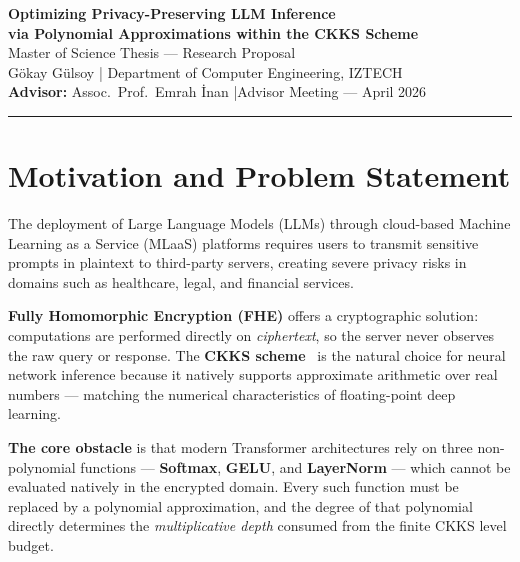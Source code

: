 \documentclass[12pt, a4paper]{article}
\begin{document}

\begin{center}
  {\LARGE\bfseries\color{iztechblue}
    Optimizing Privacy-Preserving LLM Inference\\[4pt]
    via Polynomial Approximations within the CKKS Scheme}\\[1.2em]
  {\large Master of Science Thesis — Research Proposal}\\[0.4em]
  {\normalsize
    Gökay Gülsoy \quad|\quad
    Department of Computer Engineering, IZTECH\\[0.3em]
    \textbf{Advisor:} Assoc.\ Prof.\ Emrah İnan \quad|\quad Advisor Meeting — April 2026}
\end{center}

\vspace{0.5em}
\noindent\rule{\textwidth}{1.5pt}
\vspace{0.3em}

\section{Motivation and Problem Statement}

The deployment of Large Language Models (LLMs) through cloud-based Machine Learning as a Service (MLaaS) platforms requires users to transmit sensitive prompts in plaintext to third-party servers, creating severe privacy risks in domains such as healthcare, legal, and financial services.

\textbf{Fully Homomorphic Encryption (FHE)} offers a cryptographic solution: computations are performed directly on \emph{ciphertext}, so the server never observes the raw query or response. The \textbf{CKKS scheme}~\cite{cheon2017} is the natural choice for neural network inference because it natively supports approximate arithmetic over real numbers — matching the numerical characteristics of floating-point deep learning.

\textbf{The core obstacle} is that modern Transformer architectures rely on three non-polynomial functions — \textbf{Softmax}, \textbf{GELU}, and \textbf{LayerNorm} — which cannot be evaluated natively in the encrypted domain. Every such function must be replaced by a polynomial approximation, and the degree of that polynomial directly determines the \emph{multiplicative depth} consumed from the finite CKKS level budget.
\end{document}
